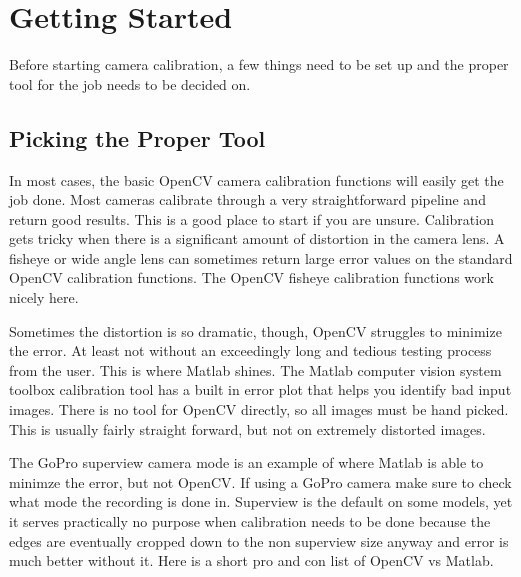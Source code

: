 \documentclass{article}
\begin{document}
\section{Getting Started}

Before starting camera calibration, a few things need to be set up and the proper tool for the job needs to be decided on. 

\subsection{Picking the Proper Tool}

In most cases, the basic OpenCV camera calibration functions will easily get the job done. Most cameras calibrate through a very straightforward pipeline and return good results. This is a good place to start if you are unsure. Calibration gets tricky when there is a significant amount of distortion in the camera lens. A fisheye or wide angle lens can sometimes return large error values on the standard OpenCV calibration functions. The OpenCV fisheye calibration functions work nicely here.

 Sometimes the distortion is so dramatic, though, OpenCV struggles to minimize the error. At least not without an exceedingly long and tedious testing process from the user. This is where Matlab shines. The Matlab computer vision system toolbox calibration tool has a built in error plot that helps you identify bad input images. There is no tool for OpenCV directly, so all images must be hand picked. This is usually fairly straight forward, but not on extremely distorted images. 
 
 The GoPro superview camera mode is an example of where Matlab is able to minimze the error, but not OpenCV. If using a GoPro camera make sure to check what mode the recording is done in. Superview is the default on some models, yet it serves practically no purpose when calibration needs to be done because the edges are eventually cropped down to the non superview size anyway and error is much better without it. Here is a short pro and con list of OpenCV vs Matlab.  
\end{document}
